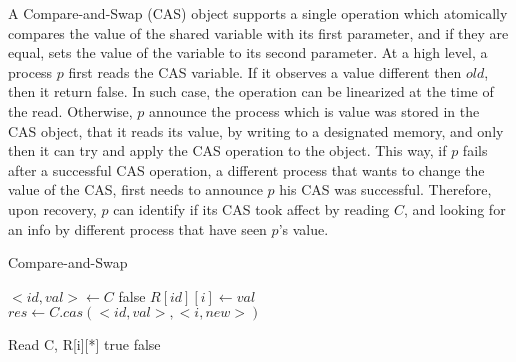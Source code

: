 A Compare-and-Swap (CAS) object supports a single operation which atomically compares the value of the shared variable with its first parameter, and if they are equal, sets the value of the variable to its second parameter.
At a high level, a process $p$ first reads the CAS variable. If it observes a value different then $old$, then it return false. In such case, the operation can be linearized at the time of the read. Otherwise, $p$ announce the process which is value was stored in the CAS object, that it reads its value, by writing to a designated memory, and only then it can try and apply the CAS operation to the object. This way, if $p$ fails after a successful CAS operation, a different process that wants to change the value of the CAS, first needs to announce $p$ his CAS was successful. Therefore, upon recovery, $p$ can identify if its CAS took affect by reading $C$, and looking for an info by different process that have seen $p$'s value.
\begin{algorithm}
	\caption{Compare-and-Swap}\label{euclid}
	\begin{algorithmic}[1]
		\State $<id,val> \gets C$
		\State \Return false
		\EndIf
		\State $R[id][i] \gets val$
		\State $res \gets C.cas(<id,val>, <i,new>)$
		\EndProcedure
		
		\State Read C, R[i][*]
		\State \Return true
		\Else {}
		\State \Return false
		\EndIf
		\EndProcedure
	\end{algorithmic}
\end{algorithm}
